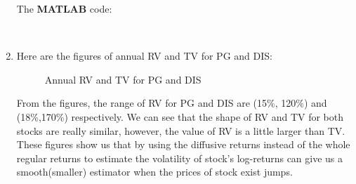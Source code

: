 \documentclass[12pt,letterpaper]{article}
\begin{document}
\begin{enumerate}[label=\textbf{(\Alph*)}]
The \textbf{MATLAB} code:
   
   ~~\\
\item
Here are the figures of annual RV and TV for PG and DIS:
 \begin{figure}[H]
            \centering
            \caption{Annual RV and TV for PG and DIS}
\end{figure}

From the figures, the range of RV for PG and DIS are (15\%, 120\%) and (18\%,170\%) respectively. We can see that the shape of RV and TV for both stocks are really similar, however, the value of RV is a little larger than TV. These figures show us that by using the diffusive returns instead of the whole regular returns to estimate the volatility of stock's log-returns can give us a smooth(smaller) estimator when the prices of stock exist jumps.\\


\end{enumerate}
\end{document}
